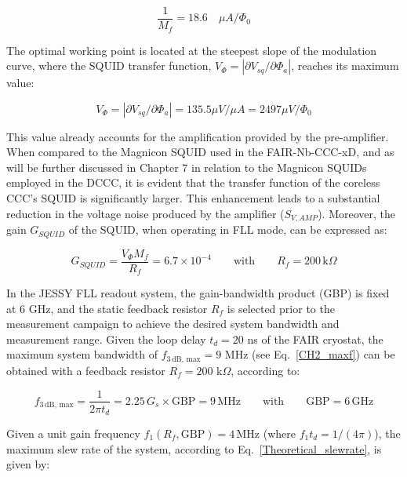 \documentclass[12pt,a4paper]{report}
\begin{document}
        \begin{equation}
        	\frac{1}{M_f} = 18.6 \quad \mu A/\Phi_0
        \end{equation}
        
        The optimal working point is located at the steepest slope of the modulation curve, where the SQUID transfer function, $V_\Phi = |\partial V_{sq}/\partial\Phi_a|$, reaches its maximum value:
        
        \begin{equation}
        	V_\Phi = |\partial V_{sq}/\partial\Phi_a| = 135.5 \mu V/\mu A = 2497 \mu V/\Phi_0
        \end{equation}
        
        This value already accounts for the amplification provided by the pre-amplifier. When compared to the Magnicon SQUID used in the FAIR-Nb-CCC-xD, and as will be further discussed in Chapter 7 in relation to the Magnicon SQUIDs employed in the DCCC, it is evident that the transfer function of the coreless CCC's SQUID is significantly larger. This enhancement leads to a substantial reduction in the voltage noise produced by the amplifier ($S_{V,AMP}$). Moreover, the gain $G_{SQUID}$ of the SQUID, when operating in FLL mode, can be expressed as:
        
        \begin{equation}
        	G_{SQUID} = \frac{V_\Phi M_f}{R_f}  = 6.7 \times 10^{-4} \qquad \text{with} \qquad R_f= 200\, \text{k}\Omega	
        \end{equation}
        
        In the JESSY FLL readout system, the gain-bandwidth product (GBP) is fixed at 6 GHz, and the static feedback resistor $R_f$ is selected prior to the measurement campaign to achieve the desired system bandwidth and measurement range. Given the loop delay $t_d = 20$ ns of the FAIR cryostat, the maximum system bandwidth of $f_{3\,\text{dB, max}} = 9$ MHz (see Eq.~\ref{CH2_maxf}) can be obtained with a feedback resistor $R_f = 200$ k$\Omega$, according to:
        
        \begin{equation}
        	f_{3\,\text{dB, max}} = \frac{1}{2\pi t_d} = 2.25 \, G_s \times \text{GBP} = 9 \, \text{MHz} \qquad \text{with} \qquad \text{GBP} = 6 \, \text{GHz}
        \end{equation}
        
        Given a unit gain frequency $f_1(R_f,\text{GBP}) = 4 \, \text{MHz}$ (where $f_1 t_d = 1/(4\pi)$), the maximum slew rate of the system, according to Eq.~\ref{Theoretical_slewrate}, is given by:
        
\end{document}
